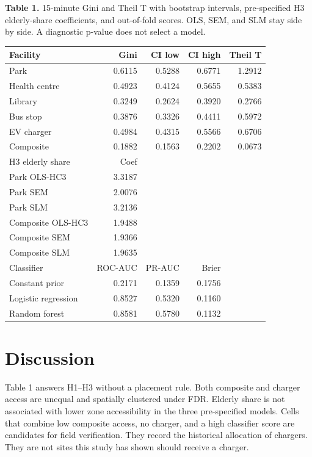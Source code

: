 \documentclass[11pt,a4paper]{article}
\begin{document}
\begin{center}
{\small
\textbf{Table 1.} 15-minute Gini and Theil T with bootstrap intervals,
pre-specified H3 elderly-share coefficients, and out-of-fold scores.
OLS, SEM, and SLM stay side by side. A diagnostic p-value does not select a model.
\par\vspace{1em}
\begin{tabular}{lrrrr}
\toprule
Facility & Gini & CI low & CI high & Theil T \\
\midrule
Park & 0.6115 & 0.5288 & 0.6771 & 1.2912 \\
Health centre & 0.4923 & 0.4124 & 0.5655 & 0.5383 \\
Library & 0.3249 & 0.2624 & 0.3920 & 0.2766 \\
Bus stop & 0.3876 & 0.3326 & 0.4411 & 0.5972 \\
EV charger & 0.4984 & 0.4315 & 0.5566 & 0.6706 \\
Composite & 0.1882 & 0.1563 & 0.2202 & 0.0673 \\
\midrule
H3 elderly share & Coef & & & \\
\midrule
Park OLS-HC3 & 3.3187 & & & \\
Park SEM & 2.0076 & & & \\
Park SLM & 3.2136 & & & \\
Composite OLS-HC3 & 1.9488 & & & \\
Composite SEM & 1.9366 & & & \\
Composite SLM & 1.9635 & & & \\
\midrule
Classifier & ROC-AUC & PR-AUC & Brier & \\
\midrule
Constant prior & 0.2171 & 0.1359 & 0.1756 & \\
Logistic regression & 0.8527 & 0.5320 & 0.1160 & \\
Random forest & 0.8581 & 0.5780 & 0.1132 & \\
\bottomrule
\end{tabular}
}
\end{center}


\section{Discussion}
Table 1 answers H1--H3 without a placement rule. Both composite and charger access are unequal and spatially clustered under FDR. Elderly share is not associated with lower zone accessibility in the three pre-specified models. Cells that combine low composite access, no charger, and a high classifier score are candidates for field verification. They record the historical allocation of chargers. They are not sites this study has shown should receive a charger.
\end{document}
